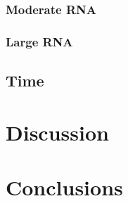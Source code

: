 \documentclass[12pt, a4paper]{article}
\begin{document}
\subsubsection{Moderate RNA}
\subsubsection{Large RNA}
\subsection{Time}

\section{Discussion}

\section{Conclusions}





\end{document}
